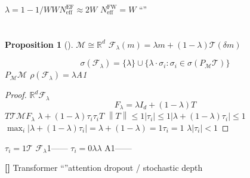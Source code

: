 \documentclass[11pt,a4paper]{article}
\newtheorem{proposition}[theorem]{Proposition}
\theoremstyle{remark}
\newcommand{\R}{\mathbb{R}}
\newcommand{\Mmem}{\mathcal{M}}
\newcommand{\Fforget}{\mathcal{F}}
\newcommand{\abs}[1]{\left\lvert#1\right\rvert}
\newcommand{\norm}[1]{\left\lVert#1\right\rVert}
\newcommand{\openproblem}{\textnormal{\textbf{[]}}}
\begin{document}
$\lambda = 1 - 1/W$$W$$N_{\text{eff}}^{\text{EF}} \approx 2W$
$N_{\text{eff}}^{\text{FW}} = W$
``''

\section{}

\begin{proposition}[]\label{prop:spectrum}
$\Mmem \cong \R^d$
$\Fforget_\lambda(m) = \lambda m + (1-\lambda)\mathcal{T}(\delta m)$

\begin{equation}
    \sigma(\Fforget_\lambda) = \{\lambda\} \cup \{\lambda \cdot \sigma_i : \sigma_i \in \sigma(P_{\Mmem}\mathcal{T})\}
\end{equation}
$P_{\Mmem}$$\Mmem$
$\rho(\Fforget_\lambda) = \lambda$A1
\end{proposition}

\begin{proof}
$\R^d$$\Fforget_\lambda$
\begin{equation}
    F_\lambda = \lambda I_d + (1-\lambda)T
\end{equation}
$T$$\mathcal{T}$$\Mmem$$F_\lambda$
$\lambda + (1-\lambda)\tau_i$$\tau_i$$T$
$\norm{T} \leq 1$$\abs{\tau_i} \leq 1$$\abs{\lambda + (1-\lambda)\tau_i} \leq 1$
$\max_i \abs{\lambda + (1-\lambda)\tau_i} = \lambda + (1-\lambda) = 1$$\tau_i = 1$
$\lambda$$\abs{\tau_i} < 1$
\end{proof}

\textbf{}$\tau_i = 1$$\mathcal{T}$
$\Fforget_\lambda$1——
$\tau_i = 0$$\lambda$$\lambda$
A1——
\textbf{}

\openproblem{} \textbf{}
Transformer
``''attention dropout / stochastic depth
\end{document}
